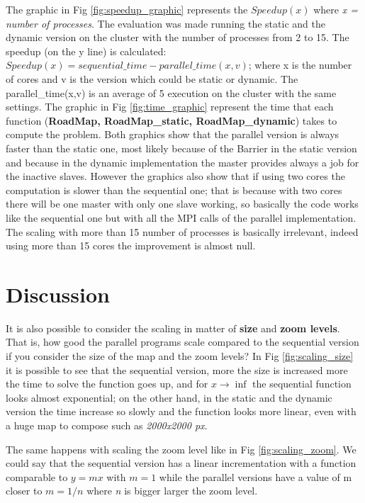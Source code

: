 \documentclass[11pt,conference]{IEEEtran}
\begin{document}
The graphic in Fig \ref{fig:speedup_graphic} represents the $Speedup(x)$ where \textit{x = number of processes}. The evaluation was made running the static and the dynamic version on the cluster with the number of processes from 2 to 15. The speedup (on the y line) is calculated: $Speedup(x) = sequential\_time - parallel\_time(x,v)$; where x is the number of cores and v is the version which could be static or dynamic. The parallel\_time(x,v) is an average of 5 execution on the cluster with the same settings.
\newline
The graphic in Fig \ref{fig:time_graphic} represent the time that each function (\textbf{RoadMap, RoadMap\_static, RoadMap\_dynamic}) takes to compute the problem.
Both graphics show that the parallel version is always faster than the static one, most likely because of the Barrier in the static version and because in the dynamic implementation the master provides always a job for the inactive slaves. However the graphics also show that if using two cores the computation is slower than the sequential one; that is because with two cores there will be one master with only one slave working, so basically the code works like the sequential one but with all the MPI calls of the parallel implementation.
\newline
The scaling with more than 15 number of processes is basically irrelevant, indeed using more than 15 cores the improvement is almost null.




\section{Discussion}
It is also possible to consider the scaling in matter of \textbf{size} and \textbf{zoom levels}. That is, how good the parallel programs scale compared to the sequential version if you consider the size of the map and the zoom levels? In Fig \ref{fig:scaling_size} it is possible to see that the sequential version, more the size is increased more the time to solve the function goes up, and for $x\to\inf$ the sequential function looks almost exponential; on the other hand, in the static and the dynamic version the time increase so slowly and the function looks more linear, even with a huge map to compose such as \textit{2000x2000 px}.



The same happens with scaling the zoom level like in Fig \ref{fig:scaling_zoom}. We could say that the sequential version has a linear incrementation with a function comparable to $y=mx$ with $m=1$ while the parallel versions have a value of m closer to $m=1/n$ where \textit{n} is bigger larger the zoom level.
\end{document}
